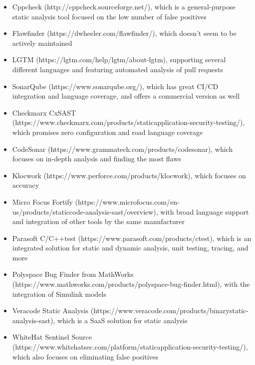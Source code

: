 \begin{itemize}
\item 
Cppcheck (http://cppcheck.sourceforge.net/), which is a general-purpose static analysis tool focused on the low number of false positives

\item 
Flawfinder (https://dwheeler.com/flawfinder/), which doesn't seem to be actively maintained 

\item 
LGTM (https://lgtm.com/help/lgtm/about-lgtm), supporting several different languages and featuring automated analysis of pull requests

\item 
SonarQube (https://www.sonarqube.org/), which has great CI/CD integration and language coverage, and offers a commercial version as well

\item 
Checkmarx CxSAST (https://www.checkmarx.com/products/staticapplication-security-testing/), which promises zero configuration and road language coverage

\item 
CodeSonar (https://www.grammatech.com/products/codesonar), which focuses on in-depth analysis and finding the most flaws

\item 
Klocwork (https://www.perforce.com/products/klocwork), which focuses on accuracy

\item 
Micro Focus Fortify (https://www.microfocus.com/en-us/products/staticcode-analysis-sast/overview), with broad language support and integration of other tools by the same manufacturer

\item 
Parasoft C/C++test (https://www.parasoft.com/products/ctest), which is an integrated solution for static and dynamic analysis, unit testing, tracing, and more

\item 
Polyspace Bug Finder from MathWorks (https://www.mathworks.com/products/polyspace-bug-finder.html), with the integration of Simulink models 

\item 
Veracode Static Analysis (https://www.veracode.com/products/binarystatic-analysis-sast), which is a SaaS solution for static analysis 

\item 
WhiteHat Sentinel Source (https://www.whitehatsec.com/platform/staticapplication-security-testing/), which also focuses on eliminating false positives
\end{itemize}

